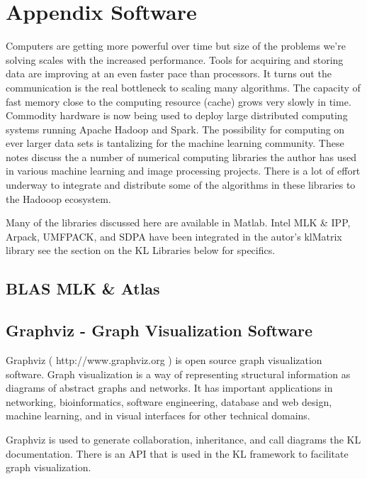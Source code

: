 
\chapter{Appendix Software}
Computers are getting more powerful over time but size of the problems we're solving scales with the increased performance. Tools for acquiring and storing data are improving at an even faster pace than processors.  It turns out the communication is the real bottleneck to scaling many algorithms. The capacity of fast memory close to the computing resource (cache) grows very slowly in time.  Commodity hardware is now being used to deploy large distributed computing systems running Apache Hadoop and Spark. The possibility for computing on ever larger data sets is tantalizing for the machine learning community.
These notes discuss the a number of numerical computing libraries the author has used in various machine learning and image processing projects.  There is a lot of effort underway to integrate and distribute some of the algorithms in these libraries to the Hadooop ecosystem.

Many of the libraries discussed here are available in Matlab. Intel MLK \& IPP, Arpack, UMFPACK, and SDPA have been integrated in the autor's klMatrix library see the section on the KL Libraries below for specifics.

\section{BLAS MLK \& Atlas}

\section{Graphviz - Graph Visualization Software}
Graphviz ( http://www.graphviz.org ) is open source graph visualization software. Graph visualization is a way of representing structural information as diagrams of abstract graphs and networks. It has important applications in networking, bioinformatics,  software engineering, database and web design, machine learning, and in visual interfaces for other technical domains.

Graphviz is used to generate collaboration, inheritance, and call diagrams the KL documentation. There is an API that is used in the KL framework to facilitate graph visualization.

